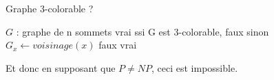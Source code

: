 \begin{center}
\begin{algorithm}[H]
\caption{Graphe 3-colorable ?}\label{ex16_algo2}
\begin{algorithmic}[1]
\REQUIRE $G$ : graphe de n sommets
\ENSURE vrai ssi G est 3-colorable, faux sinon  
		\STATE $G_x \leftarrow voisinage(x)$
			\RETURN faux
		\ENDIF
	\ENDFOR
	\RETURN vrai
\end{algorithmic}
\end{algorithm}
\end{center}

Et donc en supposant que $P \neq NP$, ceci est impossible.

